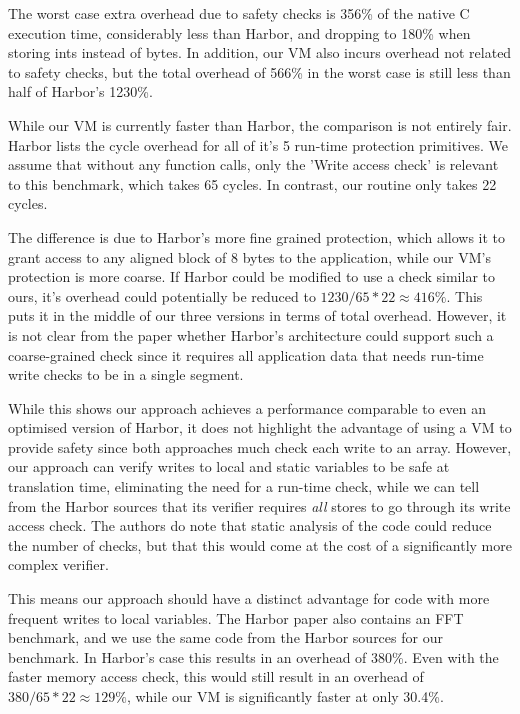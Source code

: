 The worst case extra overhead due to safety checks is 356\% of the native C execution time, considerably less than Harbor, and dropping to 180\% when storing ints instead of bytes. In addition, our VM also incurs overhead not related to safety checks, but the total overhead of 566\% in the worst case is still less than half of Harbor's 1230\%.

While our VM is currently faster than Harbor, the comparison is not entirely fair. Harbor lists the cycle overhead for all of it's 5 run-time protection primitives. We assume that without any function calls, only the 'Write access check' is relevant to this benchmark, which takes 65 cycles. In contrast, our  routine only takes 22 cycles.

The difference is due to Harbor's more fine grained protection, which allows it to grant access to any aligned block of 8 bytes to the application, while our VM's protection is more coarse. If Harbor could be modified to use a check similar to ours, it's overhead could potentially be reduced to $1230 / 65 * 22 \approx 416\%$. This puts it in the middle of our three versions in terms of total overhead. However, it is not clear from the paper whether Harbor's architecture could support such a coarse-grained check since it requires all application data that needs run-time write checks to be in a single segment.

While this shows our approach achieves a performance comparable to even an optimised version of Harbor, it does not highlight the advantage of using a VM to provide safety since both approaches much check each write to an array. However, our approach can verify writes to local and static variables to be safe at translation time, eliminating the need for a run-time check, while we can tell from the Harbor sources \cite{sos-operating-system} that its verifier requires \emph{all} stores to go through its write access check. The authors do note that static analysis of the code could reduce the number of checks, but that this would come at the cost of a significantly more complex verifier.

This means our approach should have a distinct advantage for code with more frequent writes to local variables. The Harbor paper also contains an FFT benchmark, and we use the same code from the Harbor sources for our  benchmark. In Harbor's case this results in an overhead of 380\%. Even with the faster memory access check, this would still result in an overhead of $380 / 65 * 22 \approx 129\%$, while our VM is significantly faster at only 30.4\%.
